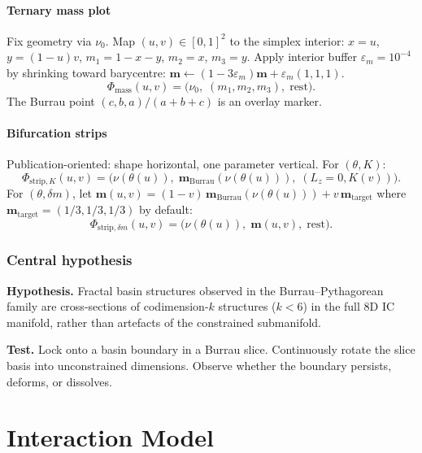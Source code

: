 \documentclass[11pt]{report}
\begin{document}
\subsection{Ternary mass plot}

Fix geometry via $\nu_0$. Map $(u,v)\in[0,1]^2$ to the simplex interior: $x=u$, $y=(1-u)v$, $m_1=1-x-y$, $m_2=x$, $m_3=y$. Apply interior buffer $\varepsilon_m=10^{-4}$ by shrinking toward barycentre: $\mathbf m\leftarrow(1-3\varepsilon_m)\mathbf m+\varepsilon_m(1,1,1)$.
\[
\boxed{\Phi_{\mathrm{mass}}(u,v)=\big(\nu_0,\;(m_1,m_2,m_3),\;\mathrm{rest}\big).}
\]
The Burrau point $(c,b,a)/(a+b+c)$ is an overlay marker.

\subsection{Bifurcation strips}

Publication-oriented: shape horizontal, one parameter vertical. For $(\theta,K)$:
\[
\boxed{\Phi_{\mathrm{strip},K}(u,v)=\big(\nu(\theta(u)),\;\mathbf m_{\mathrm{Burrau}}(\nu(\theta(u))),\;(L_z{=}0,K(v))\big).}
\]
For $(\theta,\delta m)$, let $\mathbf m(u,v)=(1-v)\,\mathbf m_{\mathrm{Burrau}}(\nu(\theta(u)))+v\,\mathbf m_{\mathrm{target}}$ where $\mathbf m_{\mathrm{target}}=(1/3,1/3,1/3)$ by default:
\[
\boxed{\Phi_{\mathrm{strip},\delta m}(u,v)=\big(\nu(\theta(u)),\;\mathbf m(u,v),\;\mathrm{rest}\big).}
\]

\section{Central hypothesis}
\label{sec:hypothesis}

\textbf{Hypothesis.} Fractal basin structures observed in the Burrau--Pythagorean family are cross-sections of codimension-$k$ structures ($k<6$) in the full 8D IC manifold, rather than artefacts of the constrained submanifold.

\textbf{Test.} Lock onto a basin boundary in a Burrau slice. Continuously rotate the slice basis into unconstrained dimensions. Observe whether the boundary persists, deforms, or dissolves.

\newpage
\part{Interaction Model}
\label{part:interaction}
\end{document}
